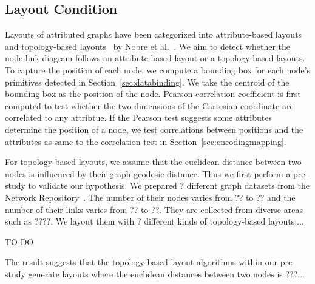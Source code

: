 \subsection{Layout Condition}
Layouts of attributed graphs have been categorized into attribute-based layouts~\cite{} and topology-based layouts~\cite{} by Nobre et al.~\cite{DBLP:journals/cgf/NobreMSL19}.
We aim to detect whether the node-link diagram follows an attribute-based layout or a topology-based layouts.
To capture the position of each node, we compute a bounding box for each node's primitives detected in Section~\ref{sec:databinding}.
We take the centroid of the bounding box as the position of the node.
Pearson correlation coefficient is first computed to test whether the two dimensions of the Cartesian coordinate are correlated to any attribtue.
If the Pearson test suggests some attributes determine the position of a node,
we test correlations between positions and the attributes as same to the correlation test in Section~\ref{sec:encodingmapping}.

For topology-based layouts, we assume that the euclidean distance between two nodes is influenced by their graph geodesic distance.
Thus we first perform a pre-study to validate our hypothesis.
We prepared ? different graph datasets from the Network Repository~\cite{}.
The number of their nodes varies from ?? to ?? and the number of their links varies from ?? to ??.
They are collected from diverse areas such as ????.
We layout them with ? different kinds of topology-based layouts:...

{\color{text-highlight}TO DO}

The result suggests that the topology-based layout algorithms within our pre-study generate layouts where the euclidean distances between two nodes is ???...
